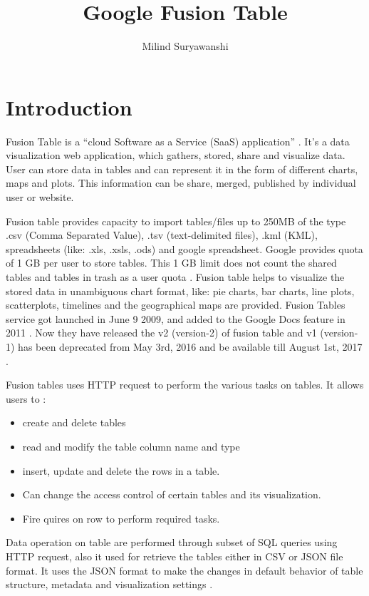 \documentclass[9pt,twocolumn,twoside]{styles/osajnl}
\title{Google Fusion Table}
\author[1,2]{Milind Suryawanshi}
\affil[1]{School of Informatics and Computing, Bloomington, IN 47408, U.S.A.}
\affil[2]{Electronics and Telecommunication Engineer,Pune University, 2010}
\affil[*]{Corresponding authors: laszewski@gmail.com}
\begin{document}
\maketitle

\section{Introduction}

Fusion Table is a “cloud Software as a Service (SaaS) application” \cite{www-1}. It’s a data visualization web application, which gathers, stored, share and visualize data. User can store data in tables and can represent it in the form of different charts, maps and plots. This information can be share, merged, published by individual user or website.  

 
Fusion table provides capacity to import tables/files up to 250MB \cite{www-2} of the type .csv (Comma Separated Value), .tsv (text-delimited files), .kml (KML), spreadsheets (like: .xls, .xsls, .ods) and google spreadsheet. Google provides quota of 1 GB per user to store tables. This 1 GB limit does not count the shared tables and tables in trash as a user quota \cite{www-2}. Fusion table helps to visualize the stored data in unambiguous chart format, like: pie charts, bar charts, line plots, scatterplots, timelines and the geographical maps are provided. Fusion Tables service got launched in June 9 2009, and added to the Google Docs feature in 2011 \cite{www-3}. Now they have released the v2 (version-2) of fusion table and v1 (version-1) has been deprecated from May 3rd, 2016 and be available till August 1st, 2017 \cite{www-4}.


Fusion tables uses HTTP request to perform the various tasks on tables. It allows users to \cite{www-5}:

\begin{itemize}
	\item create and delete tables
	\item read and modify the table column name and type
	\item insert, update and delete the rows in a table.
	\item Can change the access control of certain tables and its visualization.
	\item Fire quires on row to perform required tasks.
\end{itemize}

Data operation on table are performed through subset of SQL queries using HTTP request, also it used for retrieve the tables either in CSV or JSON file format. It uses the JSON format to make the changes in default behavior of table structure, metadata and visualization settings \cite{www-5}. 
\end{document}
